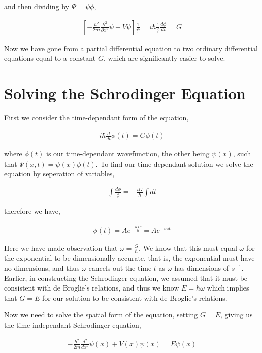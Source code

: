 \documentclass[11pt]{amsart}
\begin{document}
and then dividing by $\Psi = \psi\phi$,

\begin{align*}
  \left[-\frac{\hbar^2}{2m} \frac{\partial^2}{\partial x^2}\psi + V\psi\right] \frac{1}{\psi} = i\hbar \frac{1}{\phi} \frac{d\phi}{dt} = G
\end{align*}

Now we have gone from a partial differential equation to two ordinary differential equations equal to a constant $G$, which are significantly easier to solve.

\section{Solving the Schrodinger Equation}

First we consider the time-dependant form of the equation,

\begin{align*}
  i \hbar \frac{d}{dt} \phi(t) = G\phi(t)
\end{align*}

where $\phi(t)$ is our time-dependant wavefunction, the other being $\psi(x)$, such that $\Psi(x, t) = \psi(x)\phi(t)$. To find our time-dependant solution we solve the equation by seperation of variables,

\begin{align*}
  \int \frac{d\phi}{\phi} = -\frac{iG}{\hbar} \int dt
\end{align*}

therefore we have,

\begin{align*}
  \phi(t) = A e^{-\frac{iGT}{\hbar}} = A e^{-i \omega t}
\end{align*}

Here we have made observation that $\omega = \frac{G}{\hbar}$. We know that this must equal $\omega$ for the exponential to be dimensionally accurate, that is, the exponential must have no dimensions, and thus $\omega$ cancels out the time $t$ as $\omega$ has dimensions of $s^{-1}$. Earlier, in constructing the Schrodinger equation, we assumed that it must be consistent with de Broglie's relations, and thus we know $E = \hbar \omega$ which implies that $G = E$ for our solution to be consistent with de Broglie's relations.

Now we need to solve the spatial form of the equation, setting $G = E$, giving us the time-independant Schrodinger equation,

\begin{align*}
  - \frac{\hbar^2}{2m} \frac{d^2}{dx^2} \psi(x) + V(x)\psi(x) = E\psi(x)
\end{align*}
\end{document}
